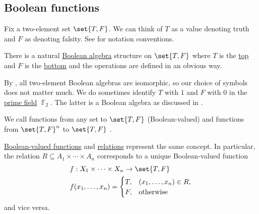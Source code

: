 \subsection{Boolean functions}\label{subsec:boolean_functions}

\begin{definition}\label{def:boolean_value}
  Fix a two-element set \( \set{ T, F } \). We can think of \( T \) as a value denoting truth and \( F \) as denoting falsity. See  for notation conventions.

  There is a natural \hyperref[def:boolean_algebra]{Boolean algebra} structure on \( \set{ T, F } \) where \( T \) is the \hyperref[def:partially_ordered_set_extremal_points/top_and_bottom]{top} and \( F \) is the \hyperref[def:partially_ordered_set_extremal_points/top_and_bottom]{bottom} and the operations are defined in an obvious way.

  By , all two-element Boolean algebras are isomorphic, so our choice of symbols does not matter much. We do sometimes identify \( T \) with \( 1 \) and \( F \) with \( 0 \) in the \hyperref[thm:finite_fields]{prime field} \( \BbbF_2 \). The latter is a Boolean algebra as discussed in .
\end{definition}

\begin{definition}\label{def:boolean_function}
  We call functions from any set to \( \set{ T, F } \) (Boolean-valued)  and functions from \( \set{ T, F }^n \) to \( \set{ T, F } \) .
\end{definition}

\begin{remark}\label{rem:boolean_valued_functions_and_predicates}
  \hyperref[def:boolean_function]{Boolean-valued functions} and \hyperref[def:relation]{relations} represent the same concept. In particular, the relation \( R \subseteq A_1 \times \cdots \times A_n \) corresponds to a unique Boolean-valued function
  \begin{equation*}
    \begin{aligned}
      &f: X_1 \times \cdots \times X_n \to \set{ T, F } \\
      &f(x_1, \ldots, x_n) = \begin{cases}
        T, &(x_1, \ldots, x_n) \in R, \\
        F, &\T{otherwise}
      \end{cases}
    \end{aligned}
  \end{equation*}
  and vice versa.
\end{remark}

